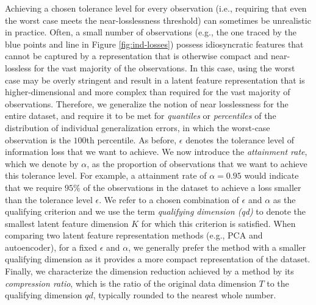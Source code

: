 Achieving a chosen tolerance level for every observation (i.e., requiring that even the worst case meets the near-losslessness threshold) can sometimes be unrealistic in practice.
Often, a small number of observations (e.g., the one traced by the blue points and line in Figure \ref{fig:ind-losses}) possess idiosyncratic features that cannot be captured by a representation that is otherwise compact and near-lossless for the vast majority of the observations.
In this case, using the worst case may be overly stringent and result in a latent feature representation that is higher-dimensional and more complex than required for the vast majority of observations.
Therefore, we generalize the notion of near losslessness for the entire dataset, and require it to be met for \emph{quantiles} or \emph{percentiles} of the distribution of individual generalization errors, in which the worst-case observation is the $100$th percentile. 
As before, $\epsilon$ denotes the tolerance level of information loss that we want to achieve.
We now introduce the \emph{attainment rate}, which we denote by $\alpha$, as the proportion of observations that we want to achieve this tolerance level.
For example, a attainment rate of $\alpha = 0.95$ would indicate that we require $95\%$ of the observations in the dataset to achieve a loss smaller than the tolerance level $\epsilon$.
We refer to a chosen combination of $\epsilon$ and $\alpha$ as the qualifying criterion and we use the term \emph{qualifying dimension (qd)} to denote the smallest latent feature dimension $K$ for which this criterion is satisfied.
When comparing two latent feature representation methods (e.g., PCA and autoencoder), for a fixed $\epsilon$ and $\alpha$, we generally prefer the method with a smaller qualifying dimension as it provides a more compact representation of the dataset.
Finally, we characterize the dimension reduction achieved by a method by its \emph{compression ratio}, which is the ratio of the original data dimension $T$ to the qualifying dimension $qd$, typically rounded to the nearest whole number.

